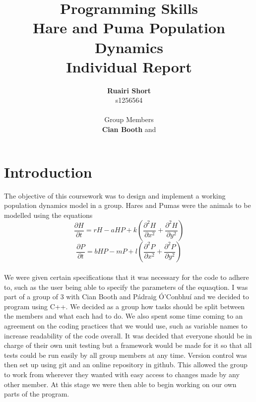 \documentclass[12pt]{article}    %
\title{\textbf{Programming Skills}\\Hare and Puma Population Dynamics\\Individual Report}  %
\author{\textbf{Ruairi Short}\\s1256564\\\\Group Members\\\textbf{Cian Booth} and \textbf{\pa}}     %
\date{}   %
\numberwithin{equation}{section}
\newcommand{\pf}[2]{\frac{\partial{#1}}{\partial{#2}}}
\begin{document}

\maketitle                 %
\begin{center}

\clearpage
{}
\end{center}

\section{Introduction}
The objective of this coursework was to design and implement a working population dynamics model in a group.
Hares and Pumas were the animals to be modelled using the equations
\[\pf{H}{t}=rH-aHP+k\left(\frac{\partial^2H}{\partial x^2}+\frac{\partial^2H}{\partial y^2}\right)\]
\[\pf{P}{t}=bHP-mP+l\left(\frac{\partial^2P}{\partial x^2}+\frac{\partial^2P}{\partial y^2}\right)\]
\\
We were given certain specifications that it was necessary for the code to adhere to, such as the user being able to specify the parameters of the equaqtion.
I was part of a group of 3 with Cian Booth and P\'{a}draig \'{O}'Conbhu\'{i} and we decided to program using C++.
We decided as a group how tasks should be split between the members and what each had to do.
We also spent some time coming to an agreement on the coding practices that we would use, such as variable names to increase readability of the code overall.
It was decided that everyone should be in charge of their own unit testing but a framework would be made for it so that all tests could be run easily by all group members at any time.
Version control was then set up using git and an online repository in github.
This allowed the group to work from wherever they wanted with easy access to changes made by any other member.
At this stage we were then able to begin working on our own parts of the program.
\end{document}
